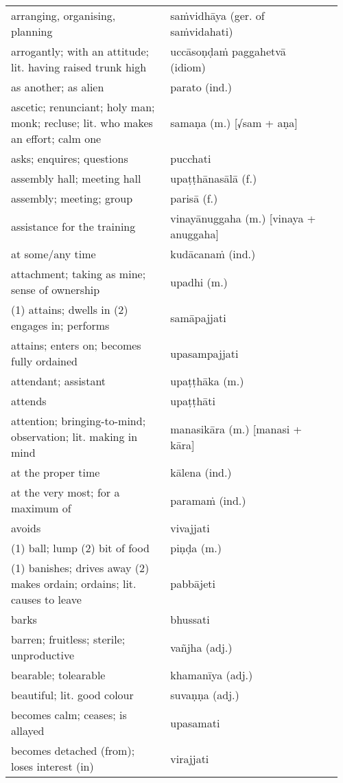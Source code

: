 \documentclass[a5paper]{memoir}
\begin{document}
\begin{longtable}{L{0.48\linewidth} L{0.48\linewidth} H}
arranging, organising, planning & saṁvidhāya (ger. of saṁvidahati) & \\[0pt]
arrogantly; with an attitude; lit. having raised trunk high & uccāsoṇḍaṁ paggahetvā (idiom) & \\[0pt]
as another; as alien & parato (ind.) & \\[0pt]
ascetic; renunciant; holy man; monk; recluse; lit. who makes an effort; calm one & samaṇa (m.) [√sam + aṇa] & \\[0pt]
asks; enquires; questions & pucchati & \\[0pt]
assembly hall; meeting hall & upaṭṭhānasālā (f.) & \\[0pt]
assembly; meeting; group & parisā (f.) & \\[0pt]
assistance for the training & vinayānuggaha (m.) [vinaya + anuggaha] & \\[0pt]
at some/any time & kudācanaṁ (ind.) & \\[0pt]
attachment; taking as mine; sense of ownership & upadhi (m.) & \\[0pt]
(1) attains; dwells in (2) engages in; performs & samāpajjati & \\[0pt]
attains; enters on; becomes fully ordained & upasampajjati & \\[0pt]
attendant; assistant & upaṭṭhāka (m.) & \\[0pt]
attends & upaṭṭhāti & \\[0pt]
attention; bringing-to-mind; observation; lit. making in mind & manasikāra (m.) [manasi + kāra] & \\[0pt]
at the proper time & kālena (ind.) & \\[0pt]
at the very most; for a maximum of & paramaṁ (ind.) & \\[0pt]
avoids & vivajjati & \\[0pt]
(1) ball; lump (2) bit of food & piṇḍa (m.) & \\[0pt]
(1) banishes; drives away (2) makes ordain; ordains; lit. causes to leave & pabbājeti & \\[0pt]
barks & bhussati & \\[0pt]
barren; fruitless; sterile; unproductive & vañjha (adj.) & \\[0pt]
bearable; tolearable & khamanīya (adj.) & \\[0pt]
beautiful; lit. good colour & suvaṇṇa (adj.) & \\[0pt]
becomes calm; ceases; is allayed & upasamati & \\[0pt]
becomes detached (from); loses interest (in) & virajjati & \\[0pt]

\end{longtable}
\end{document}
